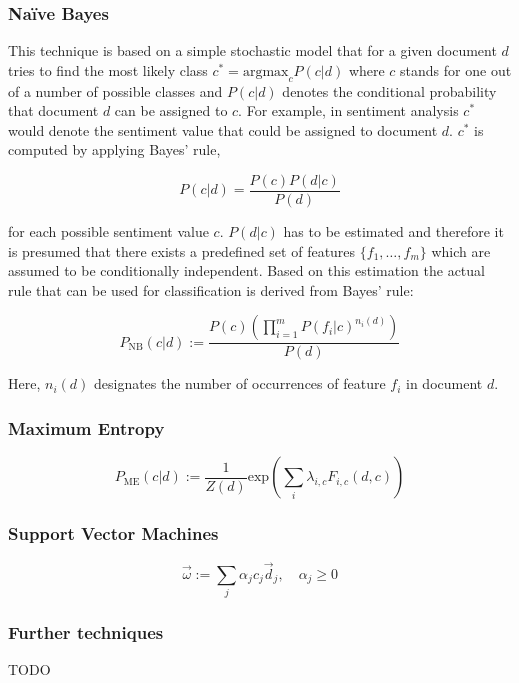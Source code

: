 \subsubsection*{Na\"ive Bayes}

This technique is based on a simple stochastic model that for a given document $d$ tries to find the most likely class $c^* = \mathrm{arg max}_c P(c \vert d)$ where $c$ stands for one out of a number of possible classes and $P(c \vert d)$ denotes the conditional probability that document $d$ can be assigned to $c$. For example, in sentiment analysis $c^*$ would denote the sentiment value that could be assigned to document $d$. $c^*$ is computed by applying Bayes' rule,

\begin{equation*}
P(c \vert d) = \frac{P(c)P(d \vert c)}{P(d)}
\end{equation*}

for each possible sentiment value $c$. $P(d \vert c)$ has to be estimated and therefore it is presumed that there exists a predefined set of features $\lbrace f_1, \ldots , f_m \rbrace$ which are assumed to be conditionally independent. Based on this estimation the actual rule that can be used for classification is derived from Bayes' rule:

\begin{equation*}
P_{\mathrm{NB}}(c \vert d) := \frac{P(c)(\prod^{m}_{i=1}P(f_i \vert c)^{n_i(d)})}{P(d)}
\end{equation*}

Here, $n_i(d)$ designates the number of occurrences of feature $f_i$ in document $d$.

\subsubsection*{Maximum Entropy}

\begin{equation*}
P_{\mathrm{ME}}(c \vert d) := \frac{1}{Z(d)}\mathrm{exp}\left( \sum_{i} \lambda_{i,c} F_{i,c}(d,c) \right)
\end{equation*}

\subsubsection*{Support Vector Machines}

\begin{equation*}
\vec{\omega} := \sum_j \alpha_j c_j \vec{d}_j,\quad \alpha_j \geq 0
\end{equation*}

\subsubsection*{Further techniques}

TODO